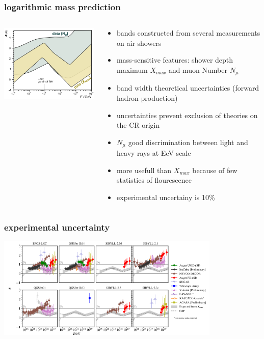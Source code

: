 \documentclass[aspectratio=1610, 9pt]{beamer}
\begin{document}
\begin{frame}\frametitle{logarithmic mass prediction}
  \begin{columns}
    \begin{column}[c]{0.48\textwidth}
      \includegraphics{lnA_right.png}
    \end{column}
    \begin{column}[c]{0.48\textwidth}
      \begin{itemize}
        \item bands constructed from several measurements on air showers
        \item mass-sensitive features: shower depth maximum $X_{max}$ and muon Number $N_{\mu}$
        \item band width \to theoretical uncertainties (forward hadron production)
        \item uncertainties prevent exclusion of theories on the CR origin
        \item $N_{\mu}$ good discrimination between light and heavy rays at EeV scale
        \item more usefull than $X_{max}$ because of few statistics of flourescence
        \item experimental uncertainy is 10\%
      \end{itemize}
    \end{column}
  \end{columns}
\end{frame}

\begin{frame}\frametitle{experimental uncertainty}
  \includegraphics[width=0.8\textwidth]{unc.png}
\end{frame}
\end{document}
